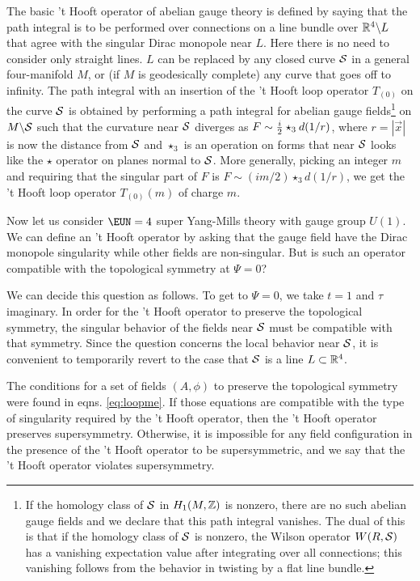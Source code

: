 The basic 't Hooft operator of abelian gauge theory is defined by
saying that the path integral is to be performed over connections
on a line bundle over $\Bbb{R}^4\backslash L$ that agree with the
singular Dirac monopole near $L$. Here there is no need to
consider only straight lines. $L$ can be replaced by any closed
curve  ${{\cal S}}$ in a general four-manifold $M$, or (if $M$ is
geodesically complete) any curve that goes off to infinity. The
path integral with an insertion of the 't Hooft loop operator
$T_{(0)}$ on the curve ${{\cal S}}$ is obtained by performing a
path integral for abelian gauge fields\footnote{If the homology class
of ${\cal S}$ in $H_1(M,\Bbb{Z})$ is nonzero, there are no such
abelian gauge fields and we declare that this path integral
vanishes. The dual of this is that if the homology class of ${\cal
S}$ is nonzero, the Wilson operator $W(R,{\cal S})$ has a
vanishing expectation value after integrating over all
connections; this vanishing follows from the behavior in twisting
by a flat line bundle.} on $M\backslash {{\cal S}}$ such that the
curvature near ${{\cal S}}$ diverges as $F\sim {i\over 2}\star_3d
(1/r)$, where $r=|\vec x|$ is now the distance from ${{\cal S}}$
and $\star_3$ is an operation on forms that near ${{\cal S}}$
looks like the $\star$ operator on planes normal to ${{\cal S}}$.
More generally, picking an integer $m$ and requiring that the
singular part of $F$ is $F\sim{(im/ 2)}\star_3 d (1/r)$, we get
the 't Hooft loop operator $T_{(0)}(m)$ of charge $m$.

Now let us consider ${\EUN}=4$ super Yang-Mills theory with gauge
group $U(1)$.  We can define an 't Hooft operator by asking that
the gauge field have the Dirac monopole singularity while other
fields are non-singular.  But is such an operator compatible with
the topological symmetry at $\Psi=0$?

We can decide this question as follows. To get to $\Psi=0$, we
take $t=1$ and $\tau$ imaginary. In order for the 't Hooft
operator to preserve the topological symmetry, the singular
behavior of the fields near ${{\cal S}}$ must be compatible with
that symmetry.  Since the question concerns the local behavior
near ${{\cal S}}$, it is convenient to temporarily revert to the
case that ${{\cal S}}$ is a line $L\subset \Bbb{R}^4$.

 The conditions for a set of fields
$(A,\phi)$ to preserve the topological symmetry were found in
eqns. \eqref{eq:loopme}.  If those equations are compatible with the type of
singularity required by the 't Hooft operator, then the 't Hooft
operator preserves supersymmetry. Otherwise, it is impossible for
any field configuration in the presence of the 't Hooft operator
to be
 supersymmetric, and we say that the 't Hooft operator violates
supersymmetry.

